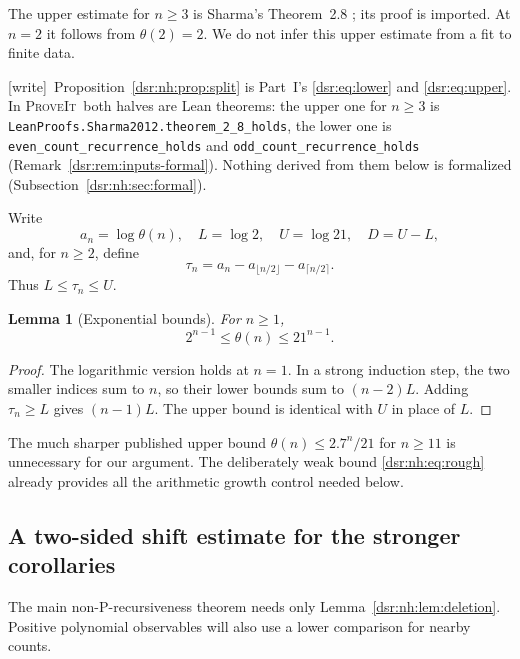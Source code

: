 \documentclass[11pt,a4paper]{article}
\numberwithin{equation}{section}
\newtheorem{lemma}[theorem]{Lemma}
\theoremstyle{definition}
\theoremstyle{remark}
\newcommand{\repo}{\textsc{ProveIt}}
\newcommand{\wtag}{\textup{[write]}}
\newcommand{\lean}[1]{\nolinkurl{#1}}
\newcommand{\tht}{\theta}
\theoremstyle{definition}
\theoremstyle{plain}
\begin{document}
The upper estimate for $n\ge3$ is Sharma's Theorem~2.8 \cite{Sharma}; its
proof is imported. At $n=2$ it follows from $\tht(2)=2$. We do not infer
this upper estimate from a fit to finite data.

\wtag\ Proposition~\ref{dsr:nh:prop:split} is Part~I's
\eqref{dsr:eq:lower} and \eqref{dsr:eq:upper}. In \repo\ both halves are
Lean theorems: the upper one for $n\ge3$ is
\lean{LeanProofs.Sharma2012.theorem_2_8_holds}, the lower one is
\lean{even_count_recurrence_holds} and \lean{odd_count_recurrence_holds}
(Remark~\ref{dsr:rem:inputs-formal}). Nothing derived from them below is
formalized (Subsection~\ref{dsr:nh:sec:formal}).

Write
\begin{equation}
a_n=\log\tht(n),\quad L=\log2,\quad U=\log21,\quad D=U-L,
\label{dsr:nh:eq:constants}
\end{equation}
and, for $n\ge2$, define
\begin{equation}
\tau_n=a_n-a_{\lfloor n/2\rfloor}-a_{\lceil n/2\rceil}.
\label{dsr:nh:eq:toll}
\end{equation}
Thus $L\le\tau_n\le U$.

\begin{lemma}[Exponential bounds]
\label{dsr:nh:lem:exponential}
For $n\ge1$,
\begin{equation}
2^{n-1}\le\tht(n)\le21^{n-1}.
\label{dsr:nh:eq:rough}
\end{equation}
\end{lemma}
\begin{proof}
The logarithmic version holds at $n=1$. In a strong induction step, the
two smaller indices sum to $n$, so their lower bounds sum to $(n-2)L$.
Adding $\tau_n\ge L$ gives $(n-1)L$. The upper bound is identical with
$U$ in place of $L$.
\end{proof}
The much sharper published upper bound $\tht(n)\le2.7^n/21$ for $n\ge11$
\cite{Sharma} is unnecessary for our argument. The deliberately weak
bound \eqref{dsr:nh:eq:rough} already provides all the arithmetic growth control
needed below.

\subsection{A two-sided shift estimate for the stronger corollaries}
The main non-P-recursiveness theorem needs only
Lemma~\ref{dsr:nh:lem:deletion}. Positive polynomial observables will also use
a lower comparison for nearby counts.
\end{document}
